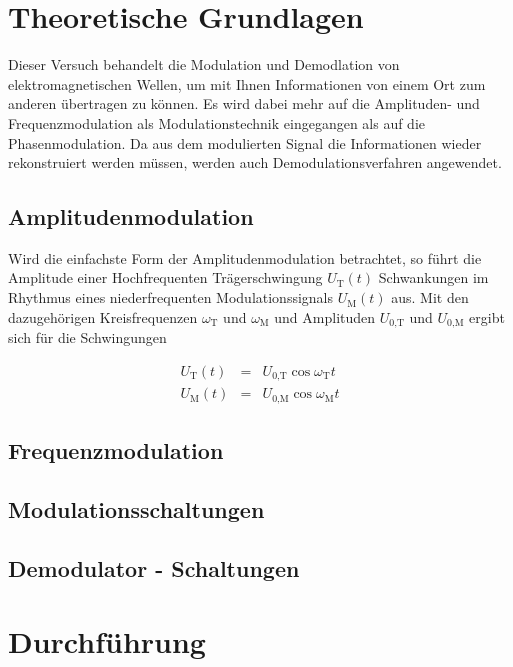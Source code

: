 \section{Theoretische Grundlagen}
\label{sec:theorie}

Dieser Versuch behandelt die Modulation und Demodlation von elektromagnetischen Wellen, um mit Ihnen Informationen von einem Ort
zum anderen übertragen zu können.
Es wird dabei mehr auf die Amplituden- und Frequenzmodulation als Modulationstechnik eingegangen als auf die Phasenmodulation.
Da aus dem modulierten Signal die Informationen wieder rekonstruiert werden müssen, werden auch Demodulationsverfahren angewendet.

\subsection{Amplitudenmodulation}
\label{subsec:klassisch}

Wird die einfachste Form der Amplitudenmodulation betrachtet, so führt die Amplitude einer Hochfrequenten Trägerschwingung $U_\text{T}(t)$ Schwankungen im Rhythmus eines niederfrequenten Modulationssignals $U_\text{M}(t)$ aus.
Mit den dazugehörigen Kreisfrequenzen $\omega_\text{T}$ und $\omega_\text{M}$ und Amplituden $U_\text{0,T}$ und $U_\text{0,M}$ ergibt sich für die Schwingungen

\begin{eqnarray*}
    U_\text{T}(t) &=& U_\text{0,T} \cos{\omega_\text{T} t} \\
    U_\text{M}(t) &=& U_\text{0,M} \cos{\omega_\text{M} t}
\end{eqnarray*}

\subsection{Frequenzmodulation}
\label{subsec:einstein}


\subsection{Modulationsschaltungen}
\label{subsec:debye}

\subsection{Demodulator - Schaltungen}
\label{subsec:debye}

\section{Durchführung}
\label{sec:durchführung}
